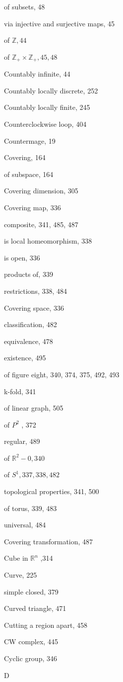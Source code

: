 of subsets, 48

via injective and surjective maps, 45

of \(\mathbb{Z},{44}\)

of \({\mathbb{Z}}_{ + } \times  {\mathbb{Z}}_{ + },{45},{48}\)

Countably infinite, 44

Countably locally discrete, 252

Countably locally finite, 245

Counterclockwise loop, 404

Countermage, 19

Covering, 164

of subspace, 164

Covering dimension, 305

Covering map, 336

composite, 341, 485, 487

is local homeomorphism, 338

is open, 336

products of, 339

restrictions, 338, 484

Covering space, 336

classification, 482

equivalence, 478

existence, 495

of figure eight, 340, 374, 375, 492, 493

k-fold, 341

of linear graph, 505

of \({P}^{2}\) , 372

regular, 489

of \({\mathbb{R}}^{2} - 0,{340}\)

of \({S}^{1},{337},{338},{482}\)

topological properties, 341, 500

of torus, 339, 483

universal, 484

Covering transformation, 487

Cube in \({\mathbb{R}}^{n}\) ,314

Curve, 225

simple closed, 379

Curved triangle, 471

Cutting a region apart, 458

CW complex, 445

Cyclic group, 346

D

